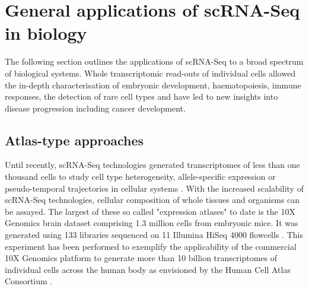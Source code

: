 
\section{General applications of scRNA-Seq in biology}

The following section outlines the applications of scRNA-Seq to a broad spectrum of biological systems. Whole transcriptomic read-outs of individual cells allowed the in-depth characterisation of embryonic development, haematopoiesis, immune responses, the detection of rare cell types and have led to new insights into disease progression including cancer development. 

\subsection{Atlas-type approaches}

Until recently, scRNA-Seq technologies generated transcriptomes of less than one thousand cells to study cell type heterogeneity, allele-specific expression or pseudo-temporal trajectories in cellular systems \citep{Kolodziejczyk2015review}. With the increased scalability of scRNA-Seq technologies, cellular composition of whole tissues and organisms can be assayed. The largest of these so called "expression atlases" to date is the 10X Genomics\textsuperscript{\textregistered}{} brain dataset comprising 1.3 million cells from embryonic mice. It was generated using 133 libraries sequenced on 11 Illumina HiSeq\textsuperscript{\textregistered}{} 4000 flowcells \citep{10XGenomics2017}. This experiment has been performed to exemplify the applicability of the commercial 10X Genomics platform to generate more than 10 billion transcriptomes of individual cells across the human body as envisioned by the Human Cell Atlas Consortium \citep{Regev2017}.\\

